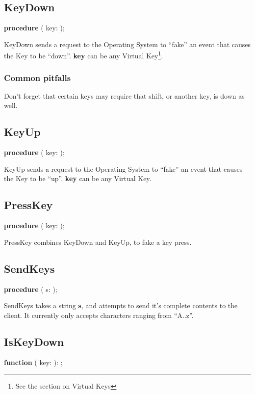 \documentclass[a4paper]{report}
\begin{document}
\subsection{KeyDown}

\textbf{procedure} {\color{blue}{KeyDown}}({\color{typeRed}
{key: }}{\color{typeGreen}{Word}});

KeyDown sends a request to the Operating System to ``fake'' an event that
causes the Key to be ``down''.
\textbf{key} can be any Virtual Key\footnote{See the section on Virtual Keys}.

\subsubsection{Common pitfalls}

Don't forget that certain keys may require that shift, or another key,
is down as well.

\subsection{KeyUp}
\textbf{procedure} {\color{blue}{KeyUp}}({\color{typeRed}
{key: }}{\color{typeGreen}{Word}});

KeyUp sends a request to the Operating System to ``fake'' an event that
causes the Key to be ``up''.
\textbf{key} can be any Virtual Key.

\subsection{PressKey}

\textbf{procedure} {\color{blue}{PressKey}}({\color{typeRed}
{key: }}{\color{typeGreen}{Word}});

PressKey combines KeyDown and KeyUp, to fake a key press.

\subsection{SendKeys}

\textbf{procedure} {\color{blue}{SendKEys}}({\color{typeRed}
{s: }}{\color{typeGreen}{String}});

SendKeys takes a string \textbf{s}, and attempts to send it's complete contents to
the client. It currently only accepts characters ranging from ``A..z''.

\subsection{IsKeyDown}
\textbf{function} {\color{blue}{PressKey}}({\color{typeRed}
{key: }}{\color{typeGreen}{Word}}): {\color{typeGreen}{Boolean}};
\end{document}
